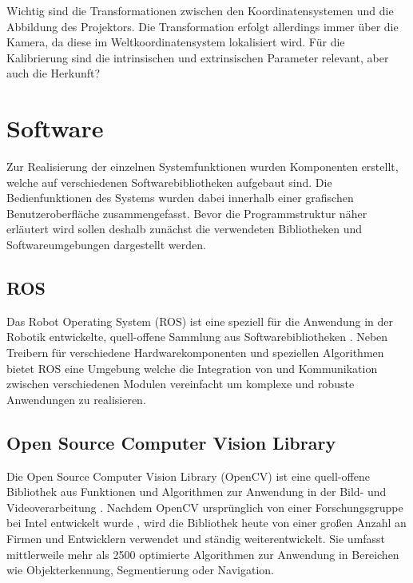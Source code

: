 
Wichtig sind die Transformationen zwischen den Koordinatensystemen und die Abbildung des Projektors. Die Transformation erfolgt allerdings immer über die Kamera, da diese im Weltkoordinatensystem lokalisiert wird. Für die Kalibrierung sind die intrinsischen und extrinsischen Parameter relevant, aber auch die Herkunft?

\section{Software}
Zur Realisierung der einzelnen Systemfunktionen wurden Komponenten erstellt, welche auf verschiedenen Softwarebibliotheken aufgebaut sind. Die Bedienfunktionen des Systems wurden dabei innerhalb einer grafischen Benutzeroberfläche zusammengefasst. Bevor die Programmstruktur näher erläutert wird sollen deshalb zunächst die verwendeten Bibliotheken und Softwareumgebungen dargestellt werden.

\subsection{ROS}
\label{chap:ros}
Das Robot Operating System (ROS) ist eine speziell für die Anwendung in der Robotik entwickelte, quell-offene Sammlung aus Softwarebibliotheken \cite{ROS}. Neben Treibern für verschiedene Hardwarekomponenten und speziellen Algorithmen bietet ROS eine Umgebung welche die Integration von und Kommunikation zwischen verschiedenen Modulen vereinfacht um komplexe und robuste Anwendungen zu realisieren. 

\subsection{Open Source Computer Vision Library}
Die Open Source Computer Vision Library (OpenCV) ist eine quell-offene Bibliothek aus Funktionen und Algorithmen zur Anwendung in der Bild- und Videoverarbeitung \cite{OpenCV}. Nachdem OpenCV ursprünglich von einer Forschungsgruppe bei Intel entwickelt wurde \cite{Laganiere2011}, wird die Bibliothek heute von einer großen Anzahl an Firmen und Entwicklern verwendet und ständig weiterentwickelt. Sie umfasst mittlerweile mehr als 2500 optimierte Algorithmen zur Anwendung in Bereichen wie Objekterkennung, Segmentierung oder Navigation.

